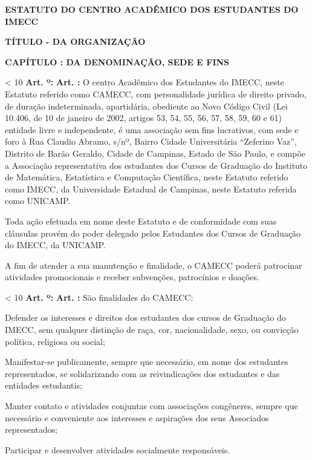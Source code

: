 \documentclass[capitulo]{br-lex}
\newcommand{\documentTitle}[1]{
    \begin{center}
        \MakeUppercase{\textbf{#1}}
    \end{center}
}
\newcounter{tit}
\newcounter{chap}
\newcounter{sec}
\newcounter{art}
\renewcommand{\titulo}[1]{
    \vspace{20pt}
    \begin{center}
        \textbf{\uppercase{Título} \Roman{tit} - \uppercase{#1}}
    \end{center}
    \stepcounter{tit}
}
\newcommand{\capitulo}[1]{
    \vspace{20pt}
    \textbf{\uppercase{Capítulo} \Roman{chap}: \uppercase{#1}}
    \stepcounter{chap}
    \setcounter{sec}{1}
}
\renewcommand{\artigo}{
    \ifnum\value{art} < 10
        \textbf{Art. \arabic{art}º:}
    \else
        \textbf{Art. \arabic{art}:}
    \fi
    \stepcounter{art}
    \setcounter{inciso}{0}
    \setcounter{paragrafo}{0}
}
\begin{document}
\pagestyle{fancy}

\documentTitle{Estatuto do Centro Acadêmico dos Estudantes do IMECC}

\titulo{da organização}

\capitulo{da denominação, sede e fins}

\artigo O centro Acadêmico dos Estudantes do IMECC, neste Estatuto referido como CAMECC, com personalidade jurídica de direito privado, de duração indeterminada, apartidária, obediente ao Novo Código Civil (Lei 10.406, de 10 de janeiro de 2002, artigos 53, 54, 55, 56, 57, 58, 59, 60 e 61) entidade livre e independente, é uma associação sem fins lucrativos, com sede e foro à Rua Claudio Abramo, s/nº, Bairro Cidade Universitária “Zeferino Vaz”, Distrito de Barão Geraldo, Cidade de Campinas, Estado de São Paulo, e compõe a Associação representativa dos estudantes dos Cursos de Graduação do Instituto de Matemática, Estatística e Computação Científica, neste Estatuto referido como IMECC, da Universidade Estadual de Campinas, neste Estatuto referida como UNICAMP.

\paragrafo Toda ação efetuada em nome deste Estatuto e de conformidade com suas cláusulas provém do poder delegado pelos Estudantes dos Cursos de Graduação do IMECC, da UNICAMP.

\paragrafo A fim de atender a sua manutenção e finalidade, o CAMECC poderá patrocinar atividades promocionais e receber subvenções, patrocínios e doações.

\artigo São finalidades do CAMECC:

\inciso Defender os interesses e direitos dos estudantes dos cursos de Graduação do IMECC, sem qualquer distinção de raça, cor, nacionalidade, sexo, ou convicção política, religiosa ou social;

\inciso Manifestar-se publicamente, sempre que necessário, em nome dos estudantes representados, se solidarizando com as reivindicações dos estudantes e das entidades estudantis;

\inciso Manter contato e atividades conjuntas com associações congêneres, sempre que necessário e conveniente aos interesses e aspirações dos seus Associados representados;

\inciso Participar e desenvolver atividades socialmente responsáveis.
\end{document}

